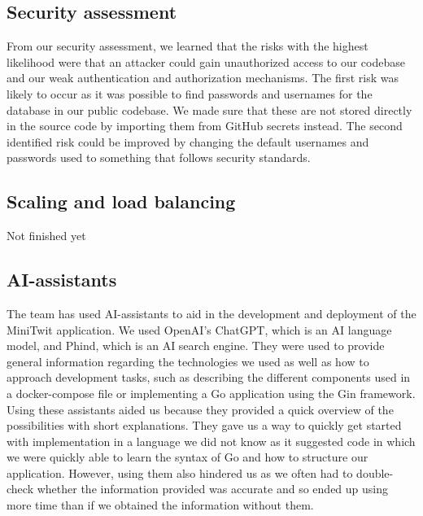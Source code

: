 \subsection{Security assessment}
From our security assessment, we learned that the risks with the highest likelihood were that an attacker could gain unauthorized access to our codebase
and our weak authentication and authorization mechanisms. The first risk was likely to occur as it was possible to find passwords and usernames for the database 
in our public codebase. We made sure that these are not stored directly in the source code by importing them from GitHub secrets instead. The second identified 
risk could be improved by changing the default usernames and passwords used to something that follows security standards.  

\subsection{Scaling and load balancing}
 Not finished yet

\subsection{AI-assistants}
The team has used AI-assistants to aid in the development and deployment of the MiniTwit application. We used OpenAI's ChatGPT, which is an AI language model, 
and Phind, which is an AI search engine. They were used to provide general information regarding the technologies we used as well as how to approach development tasks,
such as describing the different components used in a docker-compose file or implementing a Go application using the Gin framework. \\
  
Using these assistants aided us because they provided a quick overview of the possibilities with short explanations. They gave us a way to quickly get started with
implementation in a language we did not know as it suggested code in which we were quickly able to learn the syntax of Go and how to structure our application. However, 
using them also hindered us as we often had to double-check whether the information provided was accurate and so ended up using more time than if we obtained the information 
without them. 